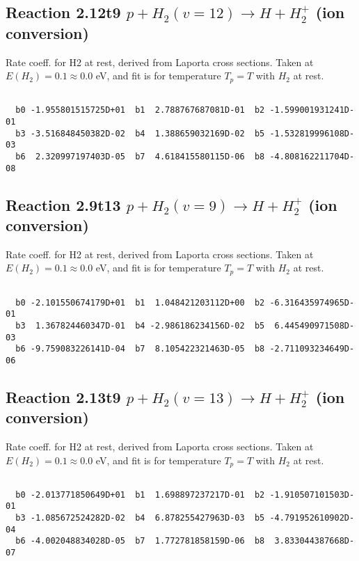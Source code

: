 \documentclass[12pt,dvipdfmx]{article}
\begin{document}
\newpage
\subsection{
Reaction 2.12t9
$ p + H_2(v=12) \rightarrow H + H_2^+$ (ion conversion)
}
Rate coeff. for H2 at rest, derived from Laporta cross sections.
Taken at $E(H_2) = 0.1 \approx 0.0$ eV,  and fit is for temperature $T_p=T$ with $H_2$ at rest.

\begin{small}\begin{verbatim}

  b0 -1.955801515725D+01  b1  2.788767687081D-01  b2 -1.599001931241D-01
  b3 -3.516848450382D-02  b4  1.388659032169D-02  b5 -1.532819996108D-03
  b6  2.320997197403D-05  b7  4.618415580115D-06  b8 -4.808162211704D-08

\end{verbatim}\end{small}

\newpage
\subsection{
Reaction 2.9t13
$ p + H_2(v=9) \rightarrow H + H_2^+$ (ion conversion)
}
Rate coeff. for H2 at rest, derived from Laporta cross sections.
Taken at $E(H_2) = 0.1 \approx 0.0$ eV,  and fit is for temperature $T_p=T$ with $H_2$ at rest.

\begin{small}\begin{verbatim}

  b0 -2.101550674179D+01  b1  1.048421203112D+00  b2 -6.316435974965D-01
  b3  1.367824460347D-01  b4 -2.986186234156D-02  b5  6.445490971508D-03
  b6 -9.759083226141D-04  b7  8.105422321463D-05  b8 -2.711093234649D-06

\end{verbatim}\end{small}

\newpage
\subsection{
Reaction 2.13t9
$ p + H_2(v=13) \rightarrow H + H_2^+$ (ion conversion)
}
Rate coeff. for H2 at rest, derived from Laporta cross sections.
Taken at $E(H_2) = 0.1 \approx 0.0$ eV,  and fit is for temperature $T_p=T$ with $H_2$ at rest.

\begin{small}\begin{verbatim}

  b0 -2.013771850649D+01  b1  1.698897237217D-01  b2 -1.910507101503D-01
  b3 -1.085672524282D-02  b4  6.878255427963D-03  b5 -4.791952610902D-04
  b6 -4.002048834028D-05  b7  1.772781858159D-06  b8  3.833044387668D-07

\end{verbatim}\end{small}
\end{document}
